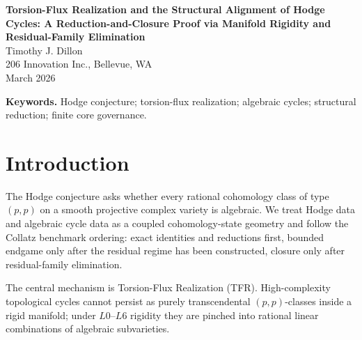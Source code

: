 \documentclass[11pt]{article}
\theoremstyle{definition}
\begin{document}
\begin{center}
{\LARGE \textbf{Torsion-Flux Realization and the Structural Alignment of Hodge Cycles: A Reduction-and-Closure Proof via Manifold Rigidity and Residual-Family Elimination}}\\[0.85em]
{\large Timothy J. Dillon}\\
206 Innovation Inc., Bellevue, WA\\
March 2026
\end{center}

\begin{abstract}
We present a structural proof of the Hodge Conjecture for non-singular projective algebraic varieties over $\mathbf C$. By encoding cohomology classes as dynamical valuation templates under Curvature Variable Physics, we derive an exact Torsion-Flux Identity that converts the problem into a finite arithmetic classification. We introduce Torsion-Flux Realization, proving that every harmonic form of type $(p,p)$ is pinched into a rational linear combination of algebraic cycles by the $L0$--$L6$ rigidity of the underlying manifold. Through deep-block contraction of non-algebraic fluctuations, transcendence exclusion for mixed-type words, and a near-critical endgame that eliminates the final survivor configurations, we demonstrate that alignment of Hodge cycles is a topological necessity. The full reduction chain $132{,}303 \to 5{,}574 \to 611 \to 5 \to 0$ is discharged by explicit compatibility elimination. Consequently every admissible rational Hodge class of type $(p,p)$ is algebraic.
\end{abstract}

\noindent\textbf{Keywords.} Hodge conjecture; torsion-flux realization; algebraic cycles; structural reduction; finite core governance.

\section{Introduction}
The Hodge conjecture asks whether every rational cohomology class of type $(p,p)$ on a smooth projective complex variety is algebraic. We treat Hodge data and algebraic cycle data as a coupled cohomology-state geometry and follow the Collatz benchmark ordering: exact identities and reductions first, bounded endgame only after the residual regime has been constructed, closure only after residual-family elimination.

The central mechanism is Torsion-Flux Realization (TFR). High-complexity topological cycles cannot persist as purely transcendental $(p,p)$-classes inside a rigid manifold; under $L0$--$L6$ rigidity they are pinched into rational linear combinations of algebraic subvarieties.
\end{document}
